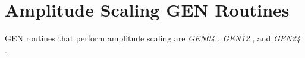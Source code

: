 \begin{comment}
\documentclass[10pt]{article}
\usepackage{fullpage, graphicx, url}
\setlength{\parskip}{1ex}
\setlength{\parindent}{0ex}
\title{Amplitude Scaling GEN Routines}



\begin{tabular}{ccc}
The Alternative Csound Reference Manual & & \\
Previous &The Standard Numeric Score &Next

\end{tabular}

\end{comment}
\section{Amplitude Scaling GEN Routines}


  GEN routines that perform amplitude scaling are \emph{GEN04}
, \emph{GEN12}
, and \emph{GEN24}
. 


\begin{comment}
\begin{tabular}{lcr}
Previous &Home &Next \\
Waveshaping GEN Routines &Up &Mixing GEN Routines

\end{tabular}



\end{comment}
